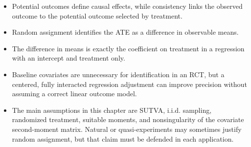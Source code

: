 \begin{itemize}
  \item Potential outcomes define causal effects, while consistency links the
  observed outcome to the potential outcome selected by treatment.
  \item Random assignment identifies the ATE as a difference in observable means.
  \item The difference in means is exactly the coefficient on treatment in a
  regression with an intercept and treatment only.
  \item Baseline covariates are unnecessary for identification in an RCT, but a
  centered, fully interacted regression adjustment can improve precision without
  assuming a correct linear outcome model.
  \item The main assumptions in this chapter are SUTVA, i.i.d. sampling, randomized
  treatment, suitable moments, and nonsingularity of the covariate second-moment
  matrix.  Natural or quasi-experiments may sometimes justify random assignment, but
  that claim must be defended in each application.
\end{itemize}
